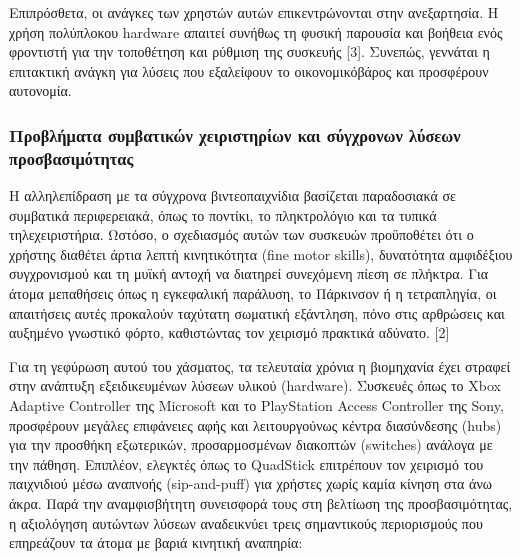 \documentclass[twoside, a4paper, 11pt]{article}
\begin{document}
Επιπρόσθετα, οι ανάγκες των χρηστών αυτών επικεντρώνονται στην ανεξαρτησία. Η χρήση πολύπλοκου hardware απαιτεί συνήθως τη φυσική παρουσία και βοήθεια ενός φροντιστή για την τοποθέτηση και ρύθμιση της συσκευής [3]. Συνεπώς, γεννάται η επιτακτική ανάγκη για λύσεις που εξαλείφουν το οικονομικόβάρος και προσφέρουν αυτονομία.

\subsubsection{Προβλήματα συμβατικών χειριστηρίων και σύγχρονων λύσεων προσβασιμότητας}
Η αλληλεπίδραση με τα σύγχρονα βιντεοπαιχνίδια βασίζεται παραδοσιακά σε συμβατικά περιφερειακά, όπως το ποντίκι, το πληκτρολόγιο και τα τυπικά τηλεχειριστήρια. Ωστόσο, ο σχεδιασμός αυτών των συσκευών προϋποθέτει ότι ο χρήστης διαθέτει άρτια λεπτή κινητικότητα (fine motor skills), δυνατότητα αμφιδέξιου συγχρονισμού και τη μυϊκή αντοχή να διατηρεί συνεχόμενη πίεση σε πλήκτρα. Για άτομα μεπαθήσεις όπως η εγκεφαλική παράλυση, το Πάρκινσον ή η τετραπληγία, οι απαιτήσεις αυτές προκαλούν ταχύτατη σωματική εξάντληση, πόνο στις αρθρώσεις και αυξημένο γνωστικό φόρτο, καθιστώντας τον χειρισμό πρακτικά αδύνατο. [2]

Για τη γεφύρωση αυτού του χάσματος, τα τελευταία χρόνια η βιομηχανία έχει στραφεί στην ανάπτυξη εξειδικευμένων λύσεων υλικού (hardware). Συσκευές όπως το Xbox Adaptive Controller της Microsoft και το PlayStation Access Controller της Sony, προσφέρουν μεγάλες επιφάνειες αφής και λειτουργούνως κέντρα διασύνδεσης (hubs) για την προσθήκη εξωτερικών, προσαρμοσμένων διακοπτών (switches) ανάλογα με την πάθηση. Επιπλέον, ελεγκτές όπως το QuadStick επιτρέπουν τον χειρισμό του παιχνιδιού μέσω αναπνοής (sip-and-puff) για χρήστες χωρίς καμία κίνηση στα άνω άκρα. Παρά την αναμφισβήτητη συνεισφορά τους στη βελτίωση της προσβασιμότητας, η αξιολόγηση αυτώντων λύσεων αναδεικνύει τρεις σημαντικούς περιορισμούς που επηρεάζουν τα άτομα με βαριά κινητική αναπηρία:
\end{document}
